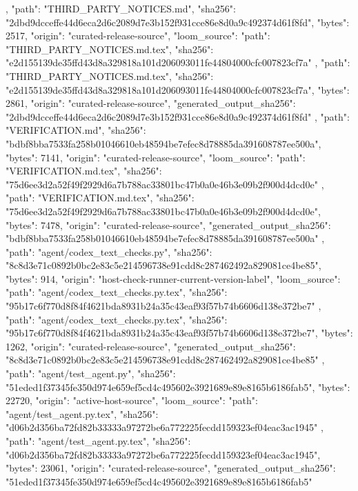 {{    },
    {
      "path": "THIRD_PARTY_NOTICES.md",
      "sha256": "2dbd9dcceffe44d6eca2d6c2089d7e3b152f931cce86e8d0a9c492374d61f8fd",
      "bytes": 2517,
      "origin": "curated-release-source",
      "loom_source": {
        "path": "THIRD_PARTY_NOTICES.md.tex",
        "sha256": "e2d155139de35ffd43d8a329818a101d206093011fe44804000cfc007823cf7a"
      }
    },
    {
      "path": "THIRD_PARTY_NOTICES.md.tex",
      "sha256": "e2d155139de35ffd43d8a329818a101d206093011fe44804000cfc007823cf7a",
      "bytes": 2861,
      "origin": "curated-release-source",
      "generated_output_sha256": "2dbd9dcceffe44d6eca2d6c2089d7e3b152f931cce86e8d0a9c492374d61f8fd"
    },
    {
      "path": "VERIFICATION.md",
      "sha256": "bdbf8bba7533fa258b01046610eb48594be7efec8d78885da391608787ee500a",
      "bytes": 7141,
      "origin": "curated-release-source",
      "loom_source": {
        "path": "VERIFICATION.md.tex",
        "sha256": "75d6ee3d2a52f49f2929d6a7b788ac33801bc47b0a0e46b3e09b2f900d4dcd0e"
      }
    },
    {
      "path": "VERIFICATION.md.tex",
      "sha256": "75d6ee3d2a52f49f2929d6a7b788ac33801bc47b0a0e46b3e09b2f900d4dcd0e",
      "bytes": 7478,
      "origin": "curated-release-source",
      "generated_output_sha256": "bdbf8bba7533fa258b01046610eb48594be7efec8d78885da391608787ee500a"
    },
    {
      "path": "agent/codex_text_checks.py",
      "sha256": "8c8d3e71c0892b0bc2e83c5e214596738e91cdd8c287462492a829081ce4be85",
      "bytes": 914,
      "origin": "host-check-runner-current-version-label",
      "loom_source": {
        "path": "agent/codex_text_checks.py.tex",
        "sha256": "95b17c6f770d8f84f4621bda8931b24a35c43eaf93f57b74b6606d138e372be7"
      }
    },
    {
      "path": "agent/codex_text_checks.py.tex",
      "sha256": "95b17c6f770d8f84f4621bda8931b24a35c43eaf93f57b74b6606d138e372be7",
      "bytes": 1262,
      "origin": "curated-release-source",
      "generated_output_sha256": "8c8d3e71c0892b0bc2e83c5e214596738e91cdd8c287462492a829081ce4be85"
    },
    {
      "path": "agent/test_agent.py",
      "sha256": "51eded1f37345fe350d974e659ef5cd4c495602e3921689e89e8165b6186fab5",
      "bytes": 22720,
      "origin": "active-host-source",
      "loom_source": {
        "path": "agent/test_agent.py.tex",
        "sha256": "d06b2d356ba72fd82b33333a97272be6a772225fecdd159323ef04eac3ac1945"
      }
    },
    {
      "path": "agent/test_agent.py.tex",
      "sha256": "d06b2d356ba72fd82b33333a97272be6a772225fecdd159323ef04eac3ac1945",
      "bytes": 23061,
      "origin": "curated-release-source",
      "generated_output_sha256": "51eded1f37345fe350d974e659ef5cd4c495602e3921689e89e8165b6186fab5"
}}
